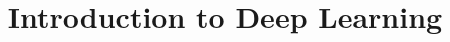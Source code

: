 \documentclass[xcolor=dvipsnames,compress,t,pdf,9pt]{beamer}
\title[\insertframenumber /\inserttotalframenumber]{Introduction to Deep Learning}
\begin{document}
	\begin{frame}
	\titlepage
	\end{frame}

%	
	
	
\end{document}
